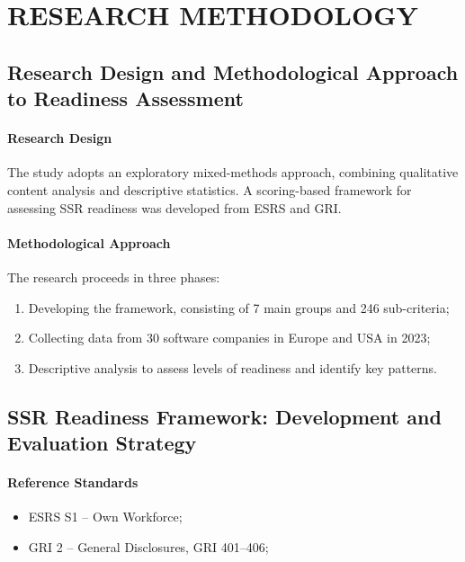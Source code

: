 \chapter{RESEARCH METHODOLOGY}

\section{Research Design and Methodological Approach to Readiness Assessment}

\subsubsection{Research Design}
The study adopts an exploratory mixed-methods approach, combining qualitative content analysis 
and descriptive statistics. 
A scoring-based framework for assessing SSR readiness was developed from ESRS and GRI.

\subsubsection{Methodological Approach}
The research proceeds in three phases:
\begin{enumerate}
    \item Developing the framework, consisting of 7 main groups and 246 sub-criteria;
    \item Collecting data from 30 software companies in Europe and USA in 2023;
    \item Descriptive analysis to assess levels of readiness and identify key patterns.
\end{enumerate}

\section{SSR Readiness Framework: Development and Evaluation Strategy}
\subsubsection{Reference Standards}
\begin{itemize}
    \item ESRS S1 -- Own Workforce;
    \item GRI 2 -- General Disclosures, GRI 401--406;
\end{itemize}

